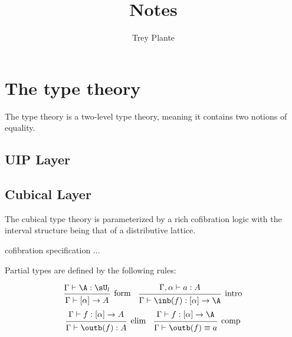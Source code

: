 \documentclass{article}
\author{Trey Plante}
\title{Notes}
\begin{document}
\maketitle
\tableofcontents

\section{The type theory}

The type theory is a two-level type theory, meaning it contains two notions of equality.

\subsection{UIP Layer}

\subsection{Cubical Layer}

The cubical type theory is parameterized by a rich cofibration logic with the interval structure being that of a distributive lattice.

cofibration specification ...

\begin{definition}
  Partial types are defined by the following rules:


    \[\begin{prooftree}
        \hypo{\Gamma \vdash \A : \sU_{l}}
        \infer1[form]{\Gamma \vdash [\alpha] \to A}
    \end{prooftree}
    \quad
    \begin{prooftree}
        \hypo{\Gamma ,\alpha \vdash a : A}
        \infer1[intro]{\Gamma \vdash \inb(f) : [\alpha] \to \A}
      \end{prooftree}
    \]
    \[
      \begin{prooftree}
        \hypo{\Gamma \vdash f : [\alpha] \to A}
        \infer1[elim]{\Gamma \vdash \outb(f) : A}
    \end{prooftree}
    \quad
    \begin{prooftree}
        \hypo{\Gamma \vdash f : [\alpha] \to \A}
        \infer1[comp]{\Gamma \vdash \outb(f) \equiv a}
    \end{prooftree}
  \]
\end{definition}
\end{document}

